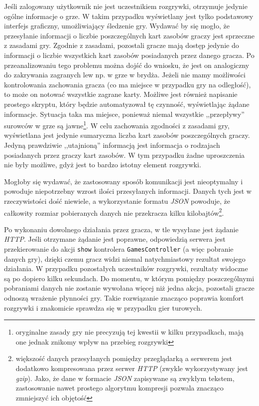 \documentclass[11pt,twoside]{report}
\begin{document}
Jeśli zalogowany użytkownik nie jest uczestnikiem rozgrywki, otrzymuje
jedynie ogólne informacje o grze. W takim przypadku wyświetlany jest
tylko podstawowy interfejs graficzny, umożliwiający śledzenie
gry. Wydawać by się mogło, że przesyłanie informacji o liczbie
poszczególnych kart zasobów graczy jest sprzeczne z zasadami gry.
Zgodnie z zasadami, pozostali gracze mają dostęp jedynie do informacji
o liczbie wszystkich kart zasobów posiadanych przez danego gracza. Po
przeanalizowaniu tego problemu można dojść do wniosku, że jest on
analogiczny do zakrywania zagranych lew np. w grze w brydża. Jeżeli
nie mamy możliwości kontrolowania zachowania gracza (co ma miejsce w
przypadku gry na odległość), to może on notować wszystkie zagrane
karty. Możliwe jest również napisanie prostego skryptu, który będzie
automatyzował tę czynność, wyświetlając żądane informacje. Sytuacja
taka ma miejsce, ponieważ niemal wszystkie ,,przepływy'' surowców w
grze są jawne\footnote{oryginalne zasady gry nie precyzują tej kwestii
  w kilku przypadkach, mają one jednak znikomy wpływ na przebieg
  rozgrywki}. W celu zachowania zgodności z zasadami gry, wyświetlana
jest jedynie sumaryczna liczba kart zasobów poszczególnych
graczy. Jedyną prawdziwie ,,utajnioną'' informacją jest informacja o
rodzajach posiadanych przez graczy kart zasobów. W tym przypadku żadne
uproszczenia nie były możliwe, gdyż jest to bardzo istotny element
rozgrywki.

Mogłoby się wydawać, że zastosowany sposób komunikacji jest
nieoptymalny i powoduje niepotrzebny wzrost ilości przesyłanych
informacji. Danych tych jest w rzeczywistości dość niewiele, a
wykorzystanie formatu \emph{JSON} powoduje, że całkowity rozmiar
pobieranych danych nie przekracza kilku kilobajtów\footnote{większość
  danych przesyłanych pomiędzy przeglądarką a serwerem jest dodatkowo
  kompresowana przez serwer \emph{HTTP} (zwykle wykorzystywany jest
  \emph{gzip}). Jako, że dane w formacie \emph{JSON} zapisywane są
  zwykłym tekstem, zastosowanie nawet prostego algorytmu kompresji
  pozwala znacząco zmniejszyć ich objętość}.

Po wykonaniu dowolnego działania przez gracza, w tle wysyłane jest
żądanie \emph{HTTP}. Jeśli otrzymane żądanie jest poprawne,
odpowiedzią serwera jest przekierowanie do akcji \texttt{show}
kontrolera \texttt{GamesController} (a więc pobranie danych gry),
dzięki czemu gracz widzi niemal natychmiastowy rezultat swojego
działania. W przypadku pozostałych uczestników rozgrywki, rezultaty
widoczne są po dopiero kilku sekundach. Do momentu, w którym pomiędzy
poszczególnymi pobraniami danych nie zostanie wywołana więcej niż
jedna akcja, pozostali gracze odnoszą wrażenie płynności gry. Takie
rozwiązanie znacząco poprawia komfort rozgrywki i znakomicie sprawdza
się w przypadku gier turowych.
\end{document}
